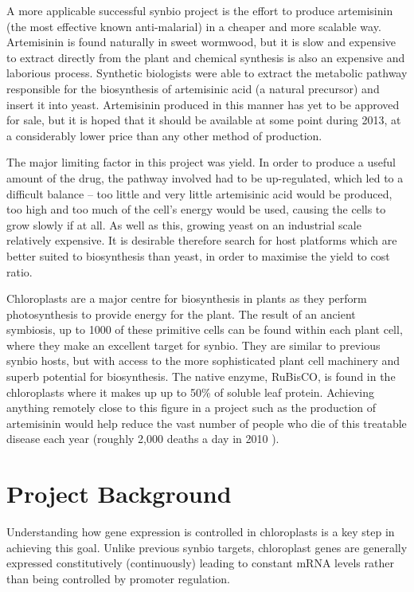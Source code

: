 \documentclass[twoside,a4paper]{article}
\begin{document}
\begin{multicols}{2}
A more applicable successful synbio project is the effort to produce 
artemisinin (the most effective known anti-malarial) in a cheaper and more 
scalable way.
Artemisinin is found naturally in sweet wormwood, but it is slow and expensive
to extract directly from the plant and chemical synthesis is also an expensive
and laborious process.
Synthetic biologists were able to extract the metabolic pathway responsible for
the biosynthesis of artemisinic acid (a natural precursor) and insert it into 
yeast\cite{yeast}.
Artemisinin produced in this manner has yet to be approved for sale, but it is
hoped that it should be available at some point during 2013, at a considerably
lower price than any other method of production.

The major limiting factor in this project was yield.
In order to produce a useful amount of the drug, the pathway involved had to be
up-regulated, which led to a difficult balance -- too little and very little
artemisinic acid would be produced, too high and too much of the cell's
energy would be used, causing the cells to grow slowly if at all.
As well as this, growing yeast on an industrial scale relatively expensive.
It is desirable therefore search for host platforms which are better suited to
biosynthesis than yeast, in order to maximise the yield to cost ratio.

Chloroplasts are a major centre for biosynthesis in plants as they perform
photosynthesis to provide energy for the plant.
The result of an ancient symbiosis, up to 1000 of these primitive cells can be 
found within each plant cell, where they make an excellent target for synbio.
They are similar to previous synbio hosts, but with access to the more
sophisticated plant cell machinery and superb potential for biosynthesis.
The native enzyme, RuBisCO, is found in the chloroplasts where it makes up
up to 50\% of soluble leaf protein.
Achieving anything remotely close to this figure in a project such as the
production of artemisinin would help reduce the vast number of people who die 
of this treatable disease each year (roughly 2,000 deaths a day in 2010
\cite{malaria}).


\section{Project Background}

Understanding how gene expression is controlled in chloroplasts is a key step
in achieving this goal.
Unlike previous synbio targets, chloroplast genes are generally expressed
constitutively (continuously) leading to constant mRNA levels rather than 
being controlled by promoter regulation\cite{Sugita1996}.


\end{multicols}
\end{document}
